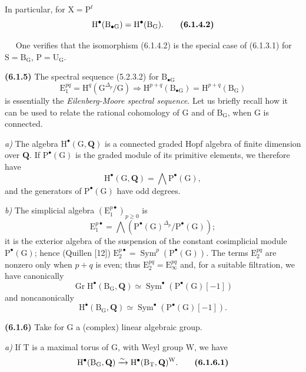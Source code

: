 \documentclass[11pt,leqno]{article}
\newcommand{\Page}[1]{\ifvmode\noindent\else\unskip\ \fi{\footnotesize\textcolor{gray}{[p.\,#1]}}\ \ignorespaces}
\begin{document}
In particular, for \(\mathrm{X}=\mathrm{P}^{t}\)
\[
\mathrm{H}^{\bullet}(\mathrm{B}_{\bullet\mathrm{G}})
=\mathrm{H}^{\bullet}(\mathrm{B}_{\mathrm{G}}).
\tag*{\textbf{(6.1.4.2)}}
\]

\Page{18}
One verifies that the isomorphism (6.1.4.2) is the special case of (6.1.3.1) for \(\mathrm{S}=\mathrm{B}_{\mathrm{G}}\), \(\mathrm{P}=\mathrm{U}_{\mathrm{G}}\).

\textbf{(6.1.5)} The spectral sequence (5.2.3.2) for \(\mathrm{B}_{\bullet\mathrm{G}}\)
\[
\mathrm{E}_{1}^{pq}=\mathrm{H}^{q}(\mathrm{G}^{\Delta_p}/\mathrm{G})
\Rightarrow
\mathrm{H}^{p+q}(\mathrm{B}_{\bullet\mathrm{G}})
=\mathrm{H}^{p+q}(\mathrm{B}_{\mathrm{G}})
\]
is essentially the \textit{Eilenberg-Moore spectral sequence}. Let us briefly recall how it can be used to relate the rational cohomology of \(\mathrm{G}\) and of \(\mathrm{B}_{\mathrm{G}}\), when \(\mathrm{G}\) is connected.

\textit{a)} The algebra \(\mathrm{H}^{\bullet}(\mathrm{G},\mathbf{Q})\) is a connected graded Hopf algebra of finite dimension over \(\mathbf{Q}\). If \(\mathrm{P}^{\bullet}(\mathrm{G})\) is the graded module of its primitive elements, we therefore have
\[
\mathrm{H}^{\bullet}(\mathrm{G},\mathbf{Q})
=\mathop{\textstyle\bigwedge}\mathrm{P}^{\bullet}(\mathrm{G}),
\]
and the generators of \(\mathrm{P}^{\bullet}(\mathrm{G})\) have odd degrees.

\textit{b)} The simplicial algebra \((\mathrm{E}_{1}^{p\bullet})_{p\geq 0}\) is
\[
\mathrm{E}_{1}^{p\bullet}
=\mathop{\textstyle\bigwedge}
(\mathrm{P}^{\bullet}(\mathrm{G})^{\Delta_p}/\mathrm{P}^{\bullet}(\mathrm{G}));
\]
it is the exterior algebra of the suspension of the constant cosimplicial module \(\mathrm{P}^{\bullet}(\mathrm{G})\); hence (Quillen [12]) \(\mathrm{E}_{2}^{p\bullet}=\operatorname{Sym}^{p}(\mathrm{P}^{\bullet}(\mathrm{G}))\). The terms \(\mathrm{E}_{2}^{pq}\) are nonzero only when \(p+q\) is even; thus \(\mathrm{E}_{2}^{pq}=\mathrm{E}_{\infty}^{pq}\) and, for a suitable filtration, we have canonically
\[
\operatorname{Gr}\mathrm{H}^{\bullet}(\mathrm{B}_{\mathrm{G}},\mathbf{Q})
\simeq\operatorname{Sym}^{\bullet}(\mathrm{P}^{\bullet}(\mathrm{G})[-1])
\]
and noncanonically
\[
\mathrm{H}^{\bullet}(\mathrm{B}_{\mathrm{G}},\mathbf{Q})
\simeq\operatorname{Sym}^{\bullet}(\mathrm{P}^{\bullet}(\mathrm{G})[-1]).
\]

\textbf{(6.1.6)} Take for \(\mathrm{G}\) a (complex) linear algebraic group.

\textit{a)} If \(\mathrm{T}\) is a maximal torus of \(\mathrm{G}\), with Weyl group \(\mathrm{W}\), we have
\[
\mathrm{H}^{\bullet}(\mathrm{B}_{\mathrm{G}},\mathbf{Q})
\xrightarrow{\sim}
\mathrm{H}^{\bullet}(\mathrm{B}_{\mathrm{T}},\mathbf{Q})^{\mathrm{W}}.
\tag*{\textbf{(6.1.6.1)}}
\]
\end{document}
